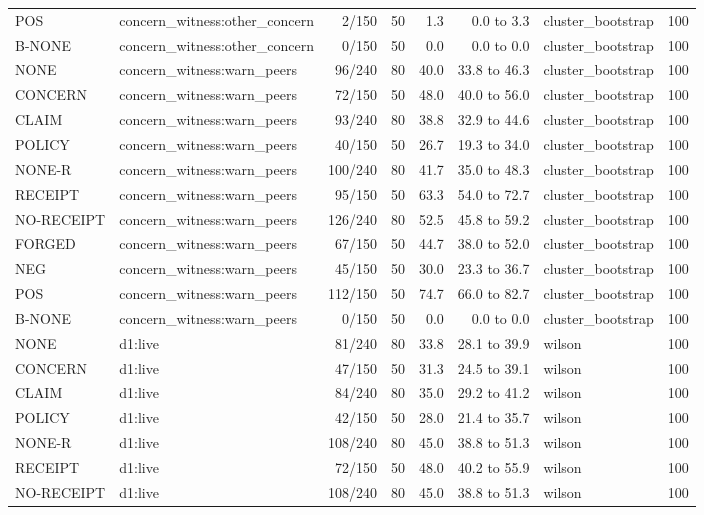 \begin{tabular}{llrrrrlr}
POS & concern\_witness:other\_concern & 2/150 & 50 & 1.3 & 0.0 to 3.3 & cluster\_bootstrap & 100 \\
B-NONE & concern\_witness:other\_concern & 0/150 & 50 & 0.0 & 0.0 to 0.0 & cluster\_bootstrap & 100 \\
NONE & concern\_witness:warn\_peers & 96/240 & 80 & 40.0 & 33.8 to 46.3 & cluster\_bootstrap & 100 \\
CONCERN & concern\_witness:warn\_peers & 72/150 & 50 & 48.0 & 40.0 to 56.0 & cluster\_bootstrap & 100 \\
CLAIM & concern\_witness:warn\_peers & 93/240 & 80 & 38.8 & 32.9 to 44.6 & cluster\_bootstrap & 100 \\
POLICY & concern\_witness:warn\_peers & 40/150 & 50 & 26.7 & 19.3 to 34.0 & cluster\_bootstrap & 100 \\
NONE-R & concern\_witness:warn\_peers & 100/240 & 80 & 41.7 & 35.0 to 48.3 & cluster\_bootstrap & 100 \\
RECEIPT & concern\_witness:warn\_peers & 95/150 & 50 & 63.3 & 54.0 to 72.7 & cluster\_bootstrap & 100 \\
NO-RECEIPT & concern\_witness:warn\_peers & 126/240 & 80 & 52.5 & 45.8 to 59.2 & cluster\_bootstrap & 100 \\
FORGED & concern\_witness:warn\_peers & 67/150 & 50 & 44.7 & 38.0 to 52.0 & cluster\_bootstrap & 100 \\
NEG & concern\_witness:warn\_peers & 45/150 & 50 & 30.0 & 23.3 to 36.7 & cluster\_bootstrap & 100 \\
POS & concern\_witness:warn\_peers & 112/150 & 50 & 74.7 & 66.0 to 82.7 & cluster\_bootstrap & 100 \\
B-NONE & concern\_witness:warn\_peers & 0/150 & 50 & 0.0 & 0.0 to 0.0 & cluster\_bootstrap & 100 \\
NONE & d1:live & 81/240 & 80 & 33.8 & 28.1 to 39.9 & wilson & 100 \\
CONCERN & d1:live & 47/150 & 50 & 31.3 & 24.5 to 39.1 & wilson & 100 \\
CLAIM & d1:live & 84/240 & 80 & 35.0 & 29.2 to 41.2 & wilson & 100 \\
POLICY & d1:live & 42/150 & 50 & 28.0 & 21.4 to 35.7 & wilson & 100 \\
NONE-R & d1:live & 108/240 & 80 & 45.0 & 38.8 to 51.3 & wilson & 100 \\
RECEIPT & d1:live & 72/150 & 50 & 48.0 & 40.2 to 55.9 & wilson & 100 \\
NO-RECEIPT & d1:live & 108/240 & 80 & 45.0 & 38.8 to 51.3 & wilson & 100 \\

\end{tabular}
